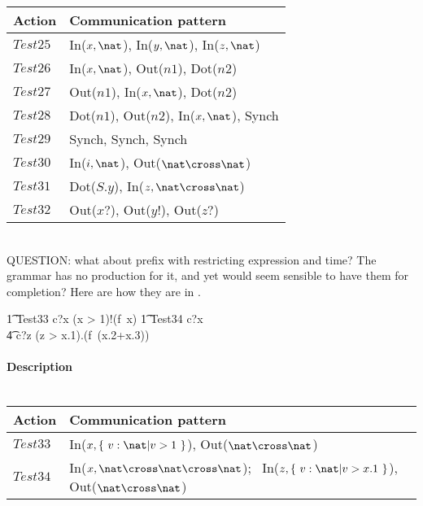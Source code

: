 \documentclass{article}
\begin{document}
\vspace{2pt}
\begin{tabular}{l|l}
   \hline
   Action   & Communication pattern \\
   \hline
   $Test25$  & In($x, \nat$), In($y, \nat$), In($z, \nat$) \\
   \hline
   $Test26$  & In($x, \nat$), Out($n1$), Dot($n2$) \\
   \hline
   $Test27$  & Out($n1$), In($x, \nat$), Dot($n2$) \\
   \hline
   $Test28$  & Dot($n1$), Out($n2$), In($x, \nat$), Synch \\
   \hline
   $Test29$  & Synch, Synch, Synch \\
   \hline
   $Test30$  & In($i, \nat$), Out($\nat \cross \nat$) \\
   \hline
   $Test31$  & Dot($S.y$), In($z, \nat \cross \nat$) \\
   \hline
   $Test32$  & Out($x?$), Out($y!$), Out($z?$) \\
   \hline
\end{tabular}
\\

QUESTION: what about prefix with restricting expression and time? The grammar has 
no production for it, and yet would seem sensible to have them for completion? Here
are how they are in \Circus.
%
\begin{circusaction}
   \t1 Test33 \circdef c?x \prefixcolon (x > 1)!(f~x) \then  \Skip
   \also
   \t1 Test34 \circdef c?x \then \\
                  \t4 c?z \prefixcolon (z > x.1).(f~(x.2+x.3)) \then \Skip 
\end{circusaction}

\paragraph{Description \\ \\}

\vspace{2pt}
\begin{tabular}{l|l}
   \hline
   Action   & Communication pattern \\
   \hline
   $Test33$  & In($x, \{~ v: \nat | v > 1 ~\}$), Out($\nat \cross \nat$) \\
   \hline
   $Test34$  & In($x, \nat \cross \nat \cross \nat$);~ In($z, \{~ v: \nat | v > x.1 ~\}$), Out($\nat \cross \nat$) \\
   \hline
\end{tabular}
\\
\end{document}
